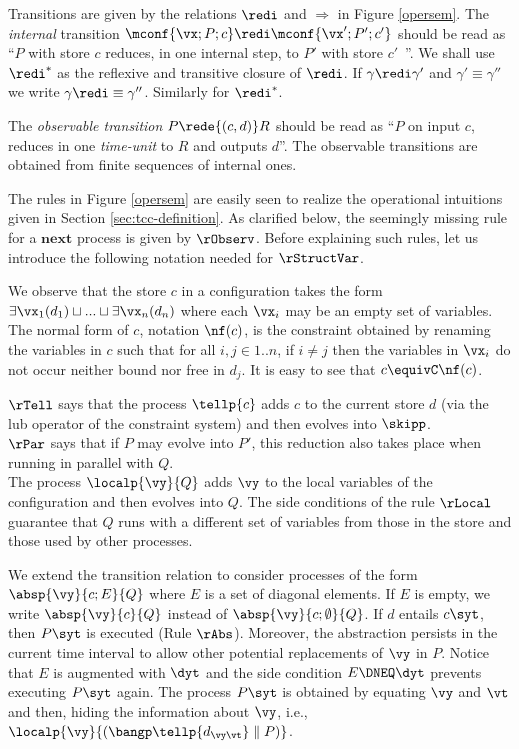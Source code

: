 \documentclass{tlp}
\begin{document}
Transitions are given by the relations $\redi$ and $\Longrightarrow$  in Figure \ref{opersem}.   The \emph{internal} transition 
$\mconf{\vx;P;c} \redi \mconf{\vx';P';c'}$
  should be read as ``\( P \)  with store \( c \) reduces, in one internal step, to \( P' \)  with store \( c'\)\ ''. We shall use $\redi^*$ as the reflexive and transitive closure of $\redi$. If $\gamma \redi \gamma'$ and $\gamma' \equiv \gamma''$ we write $\gamma \redi\equiv \gamma''$. Similarly for $\redi^*$. 


 The \emph{observable transition} {\small \( P\rede{(c,d)} R \)} should be read as ``\( P \)
on input \( c \), reduces
in one \emph{time-unit} to \( R \) and outputs \( d \)''. The observable 
transitions are obtained from finite sequences of internal ones. 

The rules in Figure \ref{opersem} 
are easily seen to realize the operational  intuitions given in Section \ref{sec:tcc-definition}. As clarified below, the seemingly missing rule  for a $\mathbf{next}$  process is given by $\rObserv$.  Before  explaining such rules, let us introduce the following notation needed for  $\rStructVar$.

\begin{notation}\label{not:nf}
We observe that  the store $c$ in a configuration takes the form $\exists \vx_1(d_1) \sqcup ... \sqcup\exists \vx_n(d_n)$ where each $\vx_i$ may be an empty set of variables. The normal form of $c$, notation $\nf(c)$, is the constraint obtained by renaming the variables in $c$ such that for all $i,j \in 1..n$, if  $i\neq j$ then the variables in  $\vx_i$ do not occur neither bound nor free in $d_j$. It is easy to see that $c \equivC \nf(c)$. 
\end{notation}


\noindent{-} $\rTell$ says that the process $\tellp{c}$ adds $c$ to the current store $d$ (via the lub operator of the constraint system) and then evolves into $\skipp$.
\\\noindent{-}  $\rPar$ says that if $P$ may evolve into $P'$, this reduction also takes place when running in parallel with  $Q$. 
\\\noindent{-} The process $\localp{\vy}{Q} $ 
adds $\vy$ to the local variables of the configuration and then evolves into $Q$.  The side conditions of the rule $\rLocal$ guarantee that $Q$ runs with a different set of variables from those in the store and those used by other processes. 

\noindent{-} We extend the transition relation to consider processes of the form $\absp{\vy}{c;E}{Q}$ where $E$ is a set of diagonal elements. 
If $E$ is empty, we write $\absp{\vy}{c}{Q}$ instead of $\absp{\vy}{c;\emptyset}{Q}$. If $d$ entails $c\syt$, then   $P\syt$ is executed (Rule $\rAbs$).
Moreover, the abstraction persists in the current time interval to allow other potential replacements of $\vy$ in $P$. Notice that $E$ is augmented with  $\dyt$
and the side condition $E  \DNEQ \dyt$ prevents  executing   $P\syt$ again.   The process $P\syt$ is obtained by equating  $\vy$ and $\vt$  and then, hiding the information about  $\vy$, i.e., $
\localp{\vy}{(\bangp\tellp{d_{\vy\vt}} \parallel  P)}$. 
\end{document}
